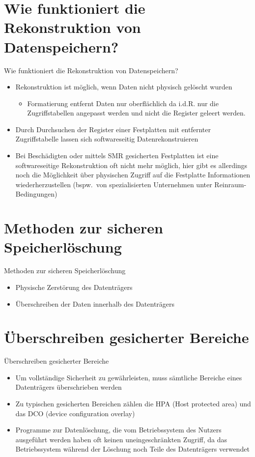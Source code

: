 \documentclass{beamer}
\begin{document}
\section{Wie funktioniert die Rekonstruktion von Datenspeichern?}
\begin{frame}{Wie funktioniert die Rekonstruktion von Datenspeichern?}
	\begin{itemize}
		\item Rekonstruktion ist möglich, wenn Daten nicht physisch gelöscht
			wurden
			\begin{itemize}
				\item Formatierung entfernt Daten nur oberflächlich da i.d.R.
					nur die Zugriffstabellen angepasst werden und nicht die
					Register geleert werden.
			\end{itemize}
		\item Durch Durchsuchen der Register einer Festplatten mit entfernter
			Zugriffstabelle lassen sich softwareseitig Datenrekonstruieren
		\item Bei Beschädigten oder mittels SMR gesicherten Festplatten ist
			eine softwareseitige Rekonstruktion oft nicht mehr möglich, hier
			gibt es allerdings noch die Möglichkeit über physischen Zugriff auf
			die Festplatte Informationen wiederherzustellen (bspw.\ von
			spezialisierten Unternehmen unter Reinraum-Bedingungen)
	\end{itemize}
\end{frame}

\section{Methoden zur sicheren Speicherlöschung}
\begin{frame}{Methoden zur sicheren Speicherlöschung}
	\begin{itemize}
		\item Physische Zerstörung des Datenträgers
		\item Überschreiben der Daten innerhalb des Datenträgers
	\end{itemize}
\end{frame}

\section{Überschreiben gesicherter Bereiche}
\begin{frame}{Überschreiben gesicherter Bereiche}
	\begin{itemize}
		\item Um vollständige Sicherheit zu gewährleisten, muss sämtliche
			Bereiche eines Datenträgers überschrieben werden
		\item Zu typischen gesicherten Bereichen zählen die HPA (Host protected
			area) und das DCO (device configuration overlay)
		\item Programme zur Datenlöschung, die vom Betriebssystem des Nutzers
			ausgeführt werden haben oft keinen uneingeschränkten Zugriff, da das
			Betriebssystem während der Löschung noch Teile des Datenträgers
			verwendet
	\end{itemize}
\end{frame}
\end{document}
